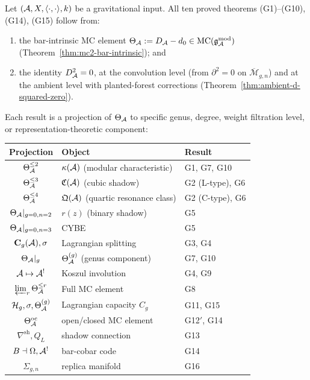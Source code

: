\begin{theorem}\ClaimStatusProvedHere
\label{thm:thqg-dependency}
Let $(\mathcal{A}, X, \langle\cdot,\cdot\rangle, k)$ be a gravitational input.
All ten proved theorems \textup{(G1)--(G10), (G14), (G15)} follow from:
\begin{enumerate}[label=\textup{(\roman*)}]
\item the bar-intrinsic MC element $\Theta_{\mathcal{A}} := D_{\mathcal{A}} - d_0 \in \mathrm{MC}(\mathfrak{g}_{\mathcal{A}}^{\mathrm{mod}})$
 (Theorem~\ref{thm:mc2-bar-intrinsic}); and
\item the identity $D_{\mathcal{A}}^2 = 0$, at the convolution level
 (from $\partial^2 = 0$ on $\overline{\mathcal{M}}_{g,n}$)
 and at the ambient level with planted-forest corrections
 (Theorem~\ref{thm:ambient-d-squared-zero}).
\end{enumerate}
Each result is a projection of $\Theta_{\mathcal{A}}$ to specific genus, degree,
weight filtration level, or representation-theoretic component:
\begin{center}
\renewcommand{\arraystretch}{1.3}
\small
\begin{tabular}{cll}
\textbf{Projection} & \textbf{Object} & \textbf{Result} \\
\hline
$\Theta_{\mathcal{A}}^{\le 2}$ & $\kappa(\mathcal{A})$ (modular characteristic)
 & G1, G7, G10 \\
$\Theta_{\mathcal{A}}^{\le 3}$ & $\mathfrak{C}(\mathcal{A})$ (cubic shadow)
 & G2 (L-type), G6 \\
$\Theta_{\mathcal{A}}^{\le 4}$ & $\mathfrak{Q}(\mathcal{A})$ (quartic resonance class)
 & G2 (C-type), G6 \\
$\Theta_{\mathcal{A}}|_{g=0,n=2}$ & $r(z)$ (binary shadow)
 & G5 \\
$\Theta_{\mathcal{A}}|_{g=0,n=3}$ & CYBE
 & G5 \\
$\mathbf{C}_g(\mathcal{A}), \sigma$ & Lagrangian splitting
 & G3, G4 \\
$\Theta_{\mathcal{A}}|_g$ & $\Theta_{\mathcal{A}}^{(g)}$ (genus component)
 & G7, G10 \\
$\mathcal{A} \mapsto \mathcal{A}^!$ & Koszul involution
 & G4, G9 \\
$\varprojlim_r \Theta_{\mathcal{A}}^{\le r}$ & Full MC element
 & G8 \\
$\mathcal{H}_g, \sigma, \Theta_{\mathcal{A}}^{(g)}$ & Lagrangian capacity $C_g$
 & G11, G15 \\
$\Theta^{\mathrm{oc}}_{\mathcal{A}}$ & open/closed MC element
 & G12$'$, G14 \\
$\nabla^{\mathrm{sh}}, Q_L$ & shadow connection
 & G13 \\
$B \dashv \Omega, \mathcal{A}^!$ & bar-cobar code
 & G14 \\
$\Sigma_{g,n}$ & replica manifold
 & G16
\end{tabular}
\end{center}
\end{theorem}

